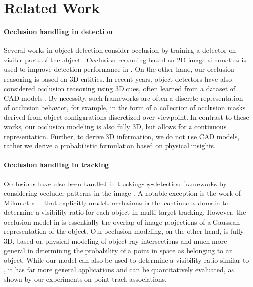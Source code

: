 \section{Related Work}
\label{sec:related}

\paragraph{Occlusion handling in detection}
Several works in object detection consider occlusion by training a detector on visible parts of the object \cite{Gao_etal_2011}. Occlusion reasoning based on 2D image silhouettes is used to improve detection performance in \cite{Hsiao_Herbert_2012}. On the other hand, our occlusion reasoning is based on 3D entities. In recent years, object detectors have also considered occlusion reasoning using 3D cues, often learned from a dataset of CAD models \cite{Pepik_etal_2012,Pepik_etal_2013,Xiang_Savarese_2013}. By necessity, such frameworks are often a discrete representation of occlusion behavior, for example, in the form of a collection of occlusion masks derived from object configurations discretized over viewpoint. In contrast to these works, our occlusion modeling is also fully 3D, but allows for a continuous representation. Further, to derive 3D information, we do not use CAD models, rather we derive a probabilistic formulation based on physical insights.


\vspace{-0.3cm}
\paragraph{Occlusion handling in tracking}
Occlusions have also been handled in tracking-by-detection frameworks by considering occluder patterns in the image \cite{Kwak_etal_2012,Wu_Nevatia_2007}. A notable exception is the work of Milan et al.~\cite{Milan_etal_2014} that explicitly models occlusions in the continuous domain to determine a visibility ratio for each object in multi-target tracking. However, the occlusion model in \cite{Milan_etal_2014} is essentially the overlap of image projections of a Gaussian representation of the object. Our occlusion modeling, on the other hand, is fully 3D, based on physical modeling of object-ray intersections and much more general in determining the probability of a point in space as belonging to an object. While our model can also be used to determine a visibility ratio similar to \cite{Milan_etal_2014}, it has far more general applications and can be quantitatively evaluated, as shown by our experiments on point track associations.


